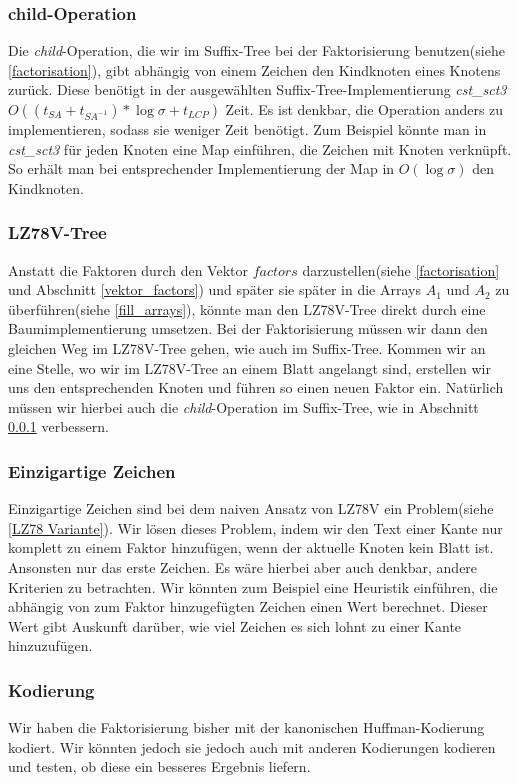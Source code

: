 \documentclass[a4paper,11pt]{scrartcl}%
\theoremstyle{change}
\theoremstyle{nonumberplain}
\theoremstyle{change}
\theoremstyle{nonumberplain}
\theoremstyle{change}
\theoremstyle{nonumberplain}
\begin{document}
\subsubsection{child-Operation}\label{child}

Die \textit{child}-Operation, die wir im Suffix-Tree bei der Faktorisierung benutzen(siehe \autoref{factorisation}), gibt abhängig von einem Zeichen den Kindknoten eines Knotens zurück. Diese benötigt in der ausgewählten Suffix-Tree-Implementierung \textit{cst\_sct3} \newline $O((t_{SA}+t_{SA^{-1}}) * \log \sigma + t_{LCP})$ Zeit\cite{sdsl}. Es ist denkbar, die Operation anders zu implementieren, sodass sie weniger Zeit benötigt. Zum Beispiel könnte man in \textit{cst\_sct3} für jeden Knoten eine Map einführen, die Zeichen mit Knoten verknüpft. So erhält man bei entsprechender Implementierung der Map in $O(\log \sigma)$ den Kindknoten.

\subsubsection{LZ78V-Tree}

Anstatt die Faktoren durch den Vektor $factors$ darzustellen(siehe \autoref{factorisation} und Abschnitt \ref{vektor_factors}) und später sie später in die Arrays $A_1$ und $A_2$ zu überführen(siehe \autoref{fill_arrays}), könnte man den LZ78V-Tree direkt durch eine Baumimplementierung umsetzen. Bei der Faktorisierung müssen wir dann den gleichen Weg im LZ78V-Tree gehen, wie auch im Suffix-Tree. Kommen wir an eine Stelle, wo wir im LZ78V-Tree an einem Blatt angelangt sind, erstellen wir uns den entsprechenden Knoten und führen so einen neuen Faktor ein. Natürlich müssen wir hierbei auch die \textit{child}-Operation im Suffix-Tree, wie in Abschnitt \ref{child} verbessern.

\subsubsection{Einzigartige Zeichen}

Einzigartige Zeichen sind bei dem naiven Ansatz von LZ78V ein Problem(siehe \autoref{LZ78 Variante}). Wir lösen dieses Problem, indem wir den Text einer Kante nur komplett zu einem Faktor hinzufügen, wenn der aktuelle Knoten kein Blatt ist. Ansonsten nur das erste Zeichen. Es wäre hierbei aber auch denkbar, andere Kriterien zu betrachten. Wir könnten zum Beispiel eine Heuristik einführen, die abhängig von zum Faktor hinzugefügten Zeichen einen Wert berechnet. Dieser Wert gibt Auskunft darüber, wie viel Zeichen es sich lohnt zu einer Kante hinzuzufügen.

\subsubsection{Kodierung}

Wir haben die Faktorisierung bisher mit der kanonischen Huffman-Kodierung kodiert. Wir könnten jedoch sie jedoch auch mit anderen Kodierungen kodieren und testen, ob diese ein besseres Ergebnis liefern.

\newpage


\newpage
	

\end{document}
